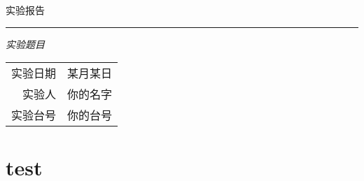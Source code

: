 \documentclass{article}
\begin{document}
\begin{titlepage}   
    \vspace*{\fill} %
    \begin{center}
        \huge{实验报告}
        \rule{\linewidth}{0.01cm}


        \vspace{0.1cm}

    
        \huge{\textit{实验题目}}


        \vspace{2cm}%
        \large{}
        \bigskip

        \vspace{2cm}%

        \vspace{2cm}%
        \begin{tabular}{|r l|}
            \hline
            实验日期 & 某月某日\\
            实验人 & 你的名字\\
            实验台号 & 你的台号\\
            \hline
        \end{tabular}
    \end{center}
\end{titlepage}
\tableofcontents
\section{test}
\end{document}
